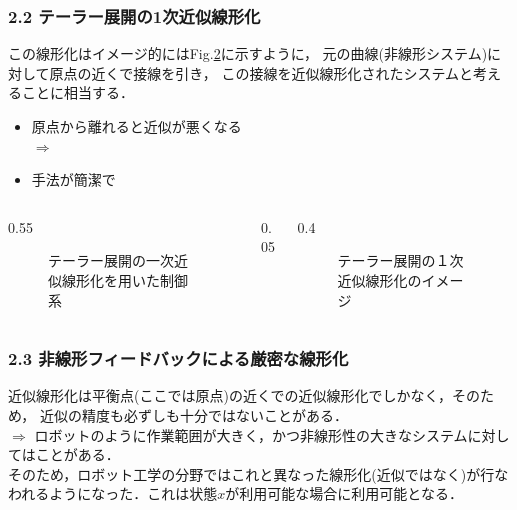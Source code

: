 \begin{frame}[t]
\frametitle{2.2 テーラー展開の1次近似線形化}
この線形化はイメージ的にはFig.\ref{image_taylor_linearization}に示すように，
元の曲線(非線形システム)に対して原点の近くで接線を引き，
この接線を近似線形化されたシステムと考えることに相当する．\\
\begin{itemize}
	\item 原点から離れると近似が悪くなる\\
	$\Longrightarrow$ 
	\item 手法が簡潔で
\end{itemize}
\vspace*{-5mm}

\begin{columns}[t]
\begin{column}{0.55\textwidth}
\begin{figure}[htbp]
 \begin{center}
  \caption{テーラー展開の一次近似線形化を用いた制御系}
  \label{block_taylor_linearization}
 \end{center}
\end{figure}
\end{column}
\begin{column}{0.05\textwidth} 
\end{column}
\begin{column}{0.4\textwidth}
\begin{figure}[htbp]
 \begin{center}
  \caption{テーラー展開の１次近似線形化のイメージ}
  \label{image_taylor_linearization}
 \end{center}
\end{figure}
\end{column}
\end{columns}
\end{frame}

\begin{frame}[t]
\frametitle{2.3 非線形フィードバックによる厳密な線形化}
近似線形化は平衡点(ここでは原点)の近くでの近似線形化でしかなく，そのため，
近似の精度も必ずしも十分ではないことがある．\\
$\Longrightarrow$ ロボットのように作業範囲が大きく，かつ非線形性の大きなシステムに対してはことがある．\\
そのため，ロボット工学の分野ではこれと異なった線形化(近似ではなく)が行なわれるようになった．これは状態$x$が利用可能な場合に利用可能となる．
\end{frame}

